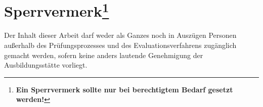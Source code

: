 \chapter*{Sperrvermerk\footnote{\textbf{Ein Sperrvermerk sollte nur bei berechtigtem Bedarf gesetzt werden!}}}

Der Inhalt dieser Arbeit darf weder als Ganzes noch in Auszügen Personen außerhalb des Prüfungsprozesses 
und des Evaluationsverfahrens zugänglich gemacht werden, sofern keine anders lautende Genehmigung der Ausbildungsstätte vorliegt. 

\cleardoublepage
